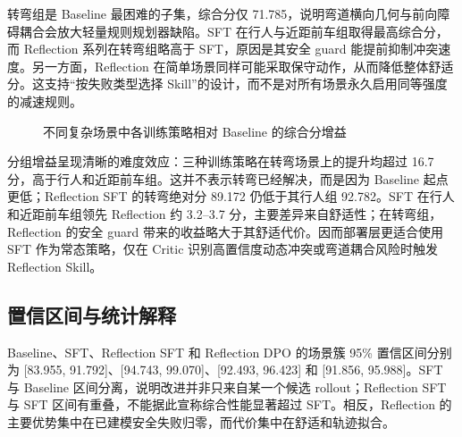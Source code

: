 \documentclass[UTF8,a4paper,12pt,fontset=fandol]{ctexart}
\begin{document}
转弯组是 Baseline 最困难的子集，综合分仅 71.785，说明弯道横向几何与前向障碍耦合会放大轻量规则规划器缺陷。SFT 在行人与近距前车组取得最高综合分，而 Reflection 系列在转弯组略高于 SFT，原因是其安全 guard 能提前抑制冲突速度。另一方面，Reflection 在简单场景同样可能采取保守动作，从而降低整体舒适分。这支持“按失败类型选择 Skill”的设计，而不是对所有场景永久启用同等强度的减速规则。

\begin{figure}[!htbp]
\centering
{}
\caption{不同复杂场景中各训练策略相对 Baseline 的综合分增益}
\end{figure}

分组增益呈现清晰的难度效应：三种训练策略在转弯场景上的提升均超过 16.7 分，高于行人和近距前车组。这并不表示转弯已经解决，而是因为 Baseline 起点更低；Reflection SFT 的转弯绝对分 89.172 仍低于其行人组 92.782。SFT 在行人和近距前车组领先 Reflection 约 3.2--3.7 分，主要差异来自舒适性；在转弯组，Reflection 的安全 guard 带来的收益略大于其舒适代价。因而部署层更适合使用 SFT 作为常态策略，仅在 Critic 识别高置信度动态冲突或弯道耦合风险时触发 Reflection Skill。

\subsection{置信区间与统计解释}
Baseline、SFT、Reflection SFT 和 Reflection DPO 的场景簇 95\% 置信区间分别为 [83.955, 91.792]、[94.743, 99.070]、[92.493, 96.423] 和 [91.856, 95.988]。SFT 与 Baseline 区间分离，说明改进并非只来自某一个候选 rollout；Reflection SFT 与 SFT 区间有重叠，不能据此宣称综合性能显著超过 SFT。相反，Reflection 的主要优势集中在已建模安全失败归零，而代价集中在舒适和轨迹拟合。
\end{document}
